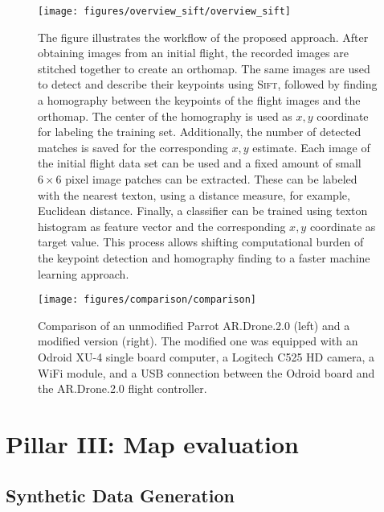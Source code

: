 \documentclass{report}
\begin{document}
\begin{figure}[h!]
\begin{center}
\texttt{[image: figures/overview\_sift/overview\_sift]}
\caption{{\label{fig:overview} The figure illustrates the workflow of
    the proposed approach. After obtaining images from an initial
    flight, the recorded images are stitched together to create an
    orthomap. The same images are used to detect and describe their
    keypoints using \textsc{Sift}, followed by finding a homography
    between the keypoints of the flight images and the orthomap. The
    center of the homography is used as $x, y$ coordinate for labeling
    the training set. Additionally, the number of detected matches is
    saved for the corresponding $x, y$ estimate. Each image of the
    initial flight data set can be used and a fixed amount of small
    $6\times6$ pixel image patches can be extracted. These can be
    labeled with the nearest texton, using a distance measure, for
    example, Euclidean distance. Finally, a classifier can be trained
    using texton histogram as feature vector and the corresponding
    $x, y$ coordinate as target value. This process allows shifting
    computational burden of the keypoint detection and homography
    finding to a faster machine learning approach.%
  }}
\end{center}
\end{figure}

\begin{figure}[h!]
\begin{center}
\texttt{[image: figures/comparison/comparison]}
\caption{{\label{fig:comparison}
Comparison of an unmodified Parrot AR.Drone.2.0 (left) and a
    modified version (right). The modified one was equipped with an
    Odroid XU-4 single board computer, a Logitech C525 HD camera, a
    WiFi module, and a USB connection between the Odroid board and the
    AR.Drone.2.0 flight controller.%
}}
\end{center}
\end{figure}

\section{Pillar III: Map evaluation}
\label{sec:mapeval}

\subsection{Synthetic Data Generation}
\label{sec:syntheticdatageneration}
\end{document}
